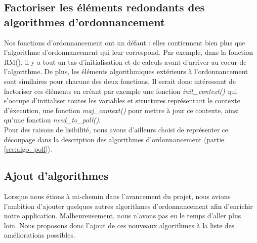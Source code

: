 		\subsection{Factoriser les éléments redondants des algorithmes d'ordonnancement}
			Nos fonctions d'ordonnancement ont un défaut : elles contiennent bien plus que l'algorithme d'ordonnancement qui leur correspond. Par exemple, dans la fonction RM(), il y a tout un tas d'initialisation et de calculs avant d'arriver au coeur de l'algorithme. De plus, les éléments algorithmiques extérieurs à l'ordonnancement sont similaires pour chacune des deux fonctions. Il serait donc intéressant de factoriser ces éléments en créant par exemple une fonction \emph{init\_context()} qui s'occupe d'initialiser toutes les variables et structures représentant le contexte d'éxecution, une fonction \emph{maj\_context()} pour mettre à jour ce contexte, ainsi qu'une fonction \emph{need\_to\_poll()}.\\
			
			Pour des raisons de lisibilité, nous avons d'ailleurs choisi de représenter ce découpage dans la description des algorithmes d'ordonnancement (partie \ref{sec:algo_poll}).
			
		\subsection{Ajout d'algorithmes}
			Lorsque nous étions à mi-chemin dans l'avancement du projet, nous avions l'ambition d'ajouter quelques autres algorithmes d'ordonnancement afin d'enrichir notre application. Malheureusement, nous n'avons pas eu le temps d'aller plus loin. Nous proposons donc l'ajout de ces nouveaux algorithmes à la liste des améliorations possibles.
